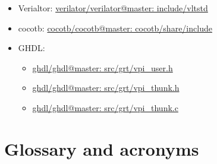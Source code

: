 \documentclass[
]{article}
\providecommand{\tightlist}{%
  \setlength{\itemsep}{0pt}\setlength{\parskip}{0pt}}
\begin{document}
\begin{itemize}
\tightlist
\item
  Verialtor: \href{https://github.com/verilator/verilator/tree/master/include/vltstd}{verilator/verilator@master: include/vltstd}
\item
  cocotb: \href{https://github.com/cocotb/cocotb/tree/master/cocotb/share/include}{cocotb/cocotb@master: cocotb/share/include}
\item
  GHDL:

  \begin{itemize}
  \tightlist
  \item
    \href{https://github.com/ghdl/ghdl/blob/master/src/grt/vpi_user.h}{ghdl/ghdl@master: src/grt/vpi\_user.h}
  \item
    \href{https://github.com/ghdl/ghdl/blob/master/src/grt/vpi_thunk.h}{ghdl/ghdl@master: src/grt/vpi\_thunk.h}
  \item
    \href{https://github.com/ghdl/ghdl/blob/master/src/grt/vpi_thunk.c}{ghdl/ghdl@master: src/grt/vpi\_thunk.c}
  \end{itemize}
\end{itemize}

\hypertarget{glossary}{%
\section*{Glossary and acronyms}\label{glossary}}
\end{document}
